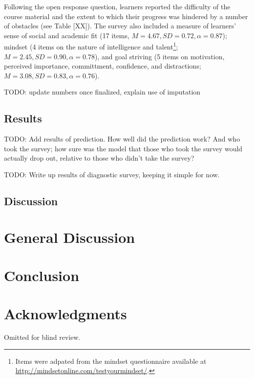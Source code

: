 \documentclass{sigchi}\usepackage[]{graphicx}\usepackage[]{color}
\begin{document}
Following the open response question, learners reported the difficulty of the course material and the extent to which their progress was hindered by a number of obstacles (see Table [XX]). The survey also included a measure of learners' sense of social and academic fit \cite{walton2007question} (17 items, $M=4.67, SD=0.72, \alpha=0.87$); mindset (4 items on the nature of intelligence and talent\footnote{Items were adpated from the mindset questionnaire available at \url{http://mindsetonline.com/testyourmindset/}.}; $M=2.45, SD=0.90, \alpha=0.78$), and goal striving (5 items on motivation, perceived importance, committment, confidence, and distractions; $M=3.08, SD=0.83, \alpha=0.76$).

TODO: update numbers once finalized, explain use of imputation

\subsection{Results}





TODO: Add results of prediction. How well did the prediction work? And who took the survey; how sure was the model that those who took the survey would actually drop out, relative to those who didn't take the survey?

TODO: Write up results of diagnostic survey, keeping it simple for now.


\subsection{Discussion}


\section{General Discussion}


\section{Conclusion}


\section{Acknowledgments}
Omitted for blind review.
\end{document}
